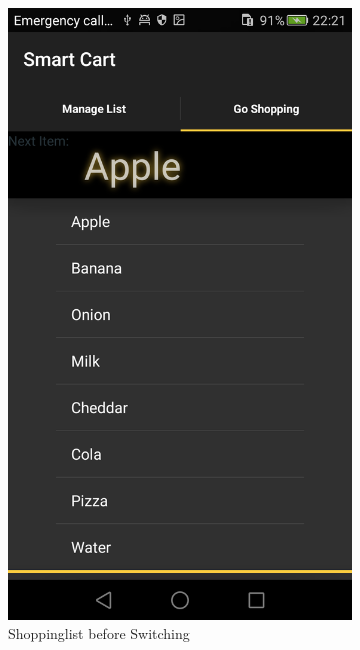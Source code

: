 \begin{figure}[h]
\captionsetup{justification=centering}
\begin{subfigure}{0.475\textwidth}
\centering 
\includegraphics[height= 0.35\textheight]{res/usermanual/notswitched.png}
\caption{Shoppinglist before Switching}
\label{fig:beforeSwitching}
\end{subfigure} \hspace{0.05\textwidth}
\begin{subfigure}{0.475\textwidth}

\end{subfigure}
\end{figure}
